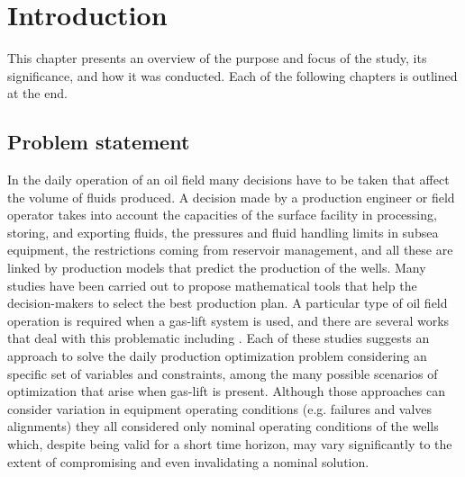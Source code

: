 
\chapter{Introduction}\label{int}
%
This chapter presents an overview of the purpose and focus of the study, its significance, and how it was conducted. Each of the following chapters is outlined at the end.

\section[Problem statement]{Problem statement\protect\footnotemark}
%
In the daily operation of an oil field many decisions have to be taken that affect the volume of fluids produced. A decision made by a production engineer or field operator takes into account the capacities of the surface facility in processing, storing, and exporting fluids, the pressures and fluid handling limits in subsea equipment, the restrictions coming from reservoir management, and all these are linked by production models that predict the production of the wells.
%
Many studies have been carried out to propose mathematical tools that help the decision-makers to select the best production plan. 
%
A particular type of oil field operation is required when a gas-lift system is used, and there are several works that deal with this problematic including \cite{Redden1974,Buitrago1996,Kosmidis2004,Campos2010,Gunnerud2010,Codas2012a,Silva2014,Lima2015}. 
%
Each of these studies suggests an approach to solve the daily production optimization problem considering an specific set of variables and constraints, among the many possible scenarios of optimization that arise when gas-lift is present.
%
Although those approaches can consider variation in equipment operating conditions (e.g. failures and valves alignments) they all considered only  nominal operating conditions of the wells which, despite being valid for a short time horizon, may vary significantly to the extent of compromising and even invalidating a nominal solution.
%

